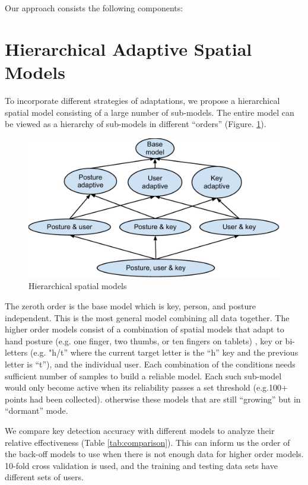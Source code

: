 \documentclass{sigchi}
\begin{document}
Our approach consists the following components:

\section{Hierarchical Adaptive Spatial Models}

To incorporate different strategies of adaptations, we propose a hierarchical
spatial model consisting of a large number of sub-models.
The entire model can be viewed as a hierarchy of sub-models in different
“orders” (Figure. \ref{fig:hierarchy}).

\begin{figure}[tb]
  \centering
  \includegraphics[width=1\columnwidth]{figures/hierarchical-spatial-model.pdf}
  \caption{Hierarchical spatial models}
  \label{fig:hierarchy}
\end{figure}

The zeroth order is the base model which is key, person, and posture
independent. This is the most general model combining all data together. The
higher order models consist of a combination of spatial models that adapt to hand posture (e.g. one finger, two thumbs, or ten fingers on tablets) , key or bi-letters (e.g. "h/t” where the current target letter is the “h” key and the previous letter is “t”), and the individual user. Each combination of the conditions needs sufficient number of samples to build a reliable model. Each such sub-model would only become active when its reliability passes a set threshold (e.g.100+ points had been collected). otherwise these models that are still “growing” but in “dormant” mode.

We compare key detection accuracy with different models to analyze their
relative effectiveness (Table \ref{tab:comparison}). This can inform us the order of the
back-off models to use when there is not enough data for higher order models.
10-fold cross validation is used, and the training and testing data sets have
different sets of users.
\end{document}
